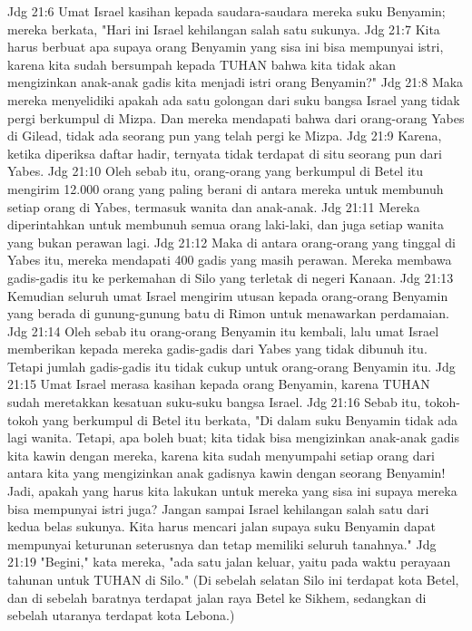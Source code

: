 Jdg 21:6  Umat Israel kasihan kepada saudara-saudara mereka suku Benyamin; mereka berkata, "Hari ini Israel kehilangan salah satu sukunya.
Jdg 21:7  Kita harus berbuat apa supaya orang Benyamin yang sisa ini bisa mempunyai istri, karena kita sudah bersumpah kepada TUHAN bahwa kita tidak akan mengizinkan anak-anak gadis kita menjadi istri orang Benyamin?"
Jdg 21:8  Maka mereka menyelidiki apakah ada satu golongan dari suku bangsa Israel yang tidak pergi berkumpul di Mizpa. Dan mereka mendapati bahwa dari orang-orang Yabes di Gilead, tidak ada seorang pun yang telah pergi ke Mizpa.
Jdg 21:9  Karena, ketika diperiksa daftar hadir, ternyata tidak terdapat di situ seorang pun dari Yabes.
Jdg 21:10  Oleh sebab itu, orang-orang yang berkumpul di Betel itu mengirim 12.000 orang yang paling berani di antara mereka untuk membunuh setiap orang di Yabes, termasuk wanita dan anak-anak.
Jdg 21:11  Mereka diperintahkan untuk membunuh semua orang laki-laki, dan juga setiap wanita yang bukan perawan lagi.
Jdg 21:12  Maka di antara orang-orang yang tinggal di Yabes itu, mereka mendapati 400 gadis yang masih perawan. Mereka membawa gadis-gadis itu ke perkemahan di Silo yang terletak di negeri Kanaan.
Jdg 21:13  Kemudian seluruh umat Israel mengirim utusan kepada orang-orang Benyamin yang berada di gunung-gunung batu di Rimon untuk menawarkan perdamaian.
Jdg 21:14  Oleh sebab itu orang-orang Benyamin itu kembali, lalu umat Israel memberikan kepada mereka gadis-gadis dari Yabes yang tidak dibunuh itu. Tetapi jumlah gadis-gadis itu tidak cukup untuk orang-orang Benyamin itu.
Jdg 21:15  Umat Israel merasa kasihan kepada orang Benyamin, karena TUHAN sudah meretakkan kesatuan suku-suku bangsa Israel.
Jdg 21:16  Sebab itu, tokoh-tokoh yang berkumpul di Betel itu berkata, "Di dalam suku Benyamin tidak ada lagi wanita. Tetapi, apa boleh buat; kita tidak bisa mengizinkan anak-anak gadis kita kawin dengan mereka, karena kita sudah menyumpahi setiap orang dari antara kita yang mengizinkan anak gadisnya kawin dengan seorang Benyamin! Jadi, apakah yang harus kita lakukan untuk mereka yang sisa ini supaya mereka bisa mempunyai istri juga? Jangan sampai Israel kehilangan salah satu dari kedua belas sukunya. Kita harus mencari jalan supaya suku Benyamin dapat mempunyai keturunan seterusnya dan tetap memiliki seluruh tanahnya."
Jdg 21:19  "Begini," kata mereka, "ada satu jalan keluar, yaitu pada waktu perayaan tahunan untuk TUHAN di Silo." (Di sebelah selatan Silo ini terdapat kota Betel, dan di sebelah baratnya terdapat jalan raya Betel ke Sikhem, sedangkan di sebelah utaranya terdapat kota Lebona.)
